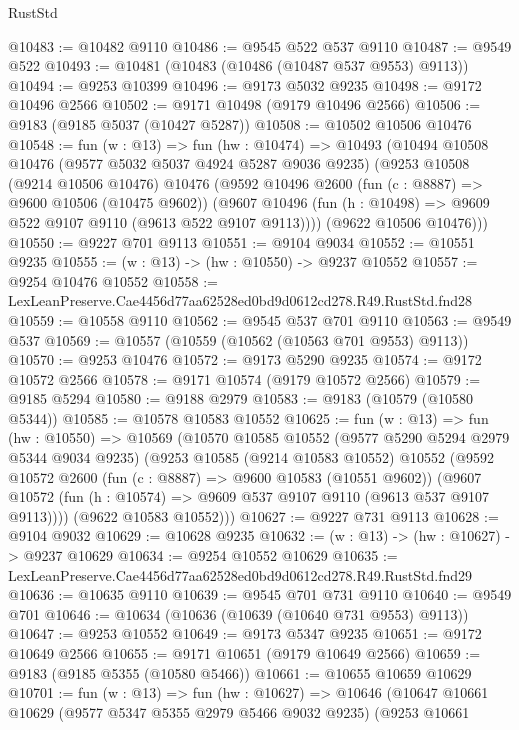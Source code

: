 \begin{lexlean}{RustStd}
\begin{coremodule}
@10483 := @10482 @9110
@10486 := @9545 @522 @537 @9110
@10487 := @9549 @522
@10493 := @10481 (@10483 (@10486 (@10487 @537 @9553) @9113))
@10494 := @9253 @10399
@10496 := @9173 @5032 @9235
@10498 := @9172 @10496 @2566
@10502 := @9171 @10498 (@9179 @10496 @2566)
@10506 := @9183 (@9185 @5037 (@10427 @5287))
@10508 := @10502 @10506 @10476
@10548 := fun (w : @13) =>
  fun (hw : @10474) =>
  @10493
    (@10494
      @10508
      @10476
      (@9577 @5032 @5037 @4924 @5287 @9036 @9235)
      (@9253
        @10508
        (@9214 @10506 @10476)
        @10476
        (@9592
          @10496
          @2600
          (fun (c : @8887) => @9600 @10506 (@10475 @9602))
          (@9607 @10496 (fun (h : @10498) => @9609 @522 @9107 @9110 (@9613 @522 @9107 @9113))))
        (@9622 @10506 @10476)))
@10550 := @9227 @701 @9113
@10551 := @9104 @9034
@10552 := @10551 @9235
@10555 := (w : @13) -> (hw : @10550) -> @9237 @10552
@10557 := @9254 @10476 @10552
@10558 := LexLeanPreserve.Cae4456d77aa62528ed0bd9d0612cd278.R49.RustStd.fnd28
@10559 := @10558 @9110
@10562 := @9545 @537 @701 @9110
@10563 := @9549 @537
@10569 := @10557 (@10559 (@10562 (@10563 @701 @9553) @9113))
@10570 := @9253 @10476
@10572 := @9173 @5290 @9235
@10574 := @9172 @10572 @2566
@10578 := @9171 @10574 (@9179 @10572 @2566)
@10579 := @9185 @5294
@10580 := @9188 @2979
@10583 := @9183 (@10579 (@10580 @5344))
@10585 := @10578 @10583 @10552
@10625 := fun (w : @13) =>
  fun (hw : @10550) =>
  @10569
    (@10570
      @10585
      @10552
      (@9577 @5290 @5294 @2979 @5344 @9034 @9235)
      (@9253
        @10585
        (@9214 @10583 @10552)
        @10552
        (@9592
          @10572
          @2600
          (fun (c : @8887) => @9600 @10583 (@10551 @9602))
          (@9607 @10572 (fun (h : @10574) => @9609 @537 @9107 @9110 (@9613 @537 @9107 @9113))))
        (@9622 @10583 @10552)))
@10627 := @9227 @731 @9113
@10628 := @9104 @9032
@10629 := @10628 @9235
@10632 := (w : @13) -> (hw : @10627) -> @9237 @10629
@10634 := @9254 @10552 @10629
@10635 := LexLeanPreserve.Cae4456d77aa62528ed0bd9d0612cd278.R49.RustStd.fnd29
@10636 := @10635 @9110
@10639 := @9545 @701 @731 @9110
@10640 := @9549 @701
@10646 := @10634 (@10636 (@10639 (@10640 @731 @9553) @9113))
@10647 := @9253 @10552
@10649 := @9173 @5347 @9235
@10651 := @9172 @10649 @2566
@10655 := @9171 @10651 (@9179 @10649 @2566)
@10659 := @9183 (@9185 @5355 (@10580 @5466))
@10661 := @10655 @10659 @10629
@10701 := fun (w : @13) =>
  fun (hw : @10627) =>
  @10646
    (@10647
      @10661
      @10629
      (@9577 @5347 @5355 @2979 @5466 @9032 @9235)
      (@9253
        @10661

\end{coremodule}
\end{lexlean}
